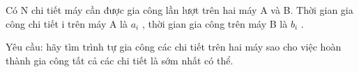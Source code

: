 Có N chi tiết máy cần được gia công lần lượt trên hai máy A và B. Thời gian gia công chi tiết i trên máy A là $a_{i}$   , thời gian gia công trên máy B là $b_{i}$   .  

   Yêu cầu: hãy tìm trình tự gia công các chi tiết trên hai máy sao cho việc hoàn thành gia công tất cả các chi tiết là sớm nhất có thể.